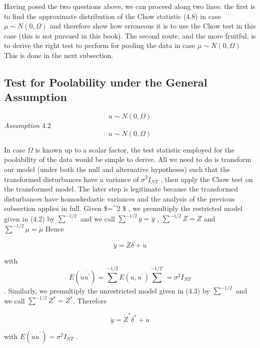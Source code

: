 \documentclass[
]{book}
\begin{document}
Having posed the two questions above, we can proceed along two lines: the first is to find the approximate distribution of the Chow statistic (4.8) in case \(\mu \sim N \left(0,\Omega \right)\) and therefore show
how erroneous it is to use the Chow test in this case (this is not pursued in this book). The second route, and the more fruitful, is to derive the right test to perform for pooling the data in case \(\mu \sim N \left(0,\Omega \right)\) This is done in the next subsection.

\hypertarget{test-for-poolability-under-the-general-assumption}{%
\subsection{Test for Poolability under the General Assumption}\label{test-for-poolability-under-the-general-assumption}}

\[ u \sim N\left(0, \Omega\right)\]
\emph{Assumption} 4.2 \[ u \sim N\left(0, \Omega\right)\]

In case \(\Omega\) is known up to a scalar factor, the test statistic employed for the poolability of
the data would be simple to derive. All we need to do is transform our model (under both
the null and alternative hypotheses) such that the transformed disturbances have a variance of \(\sigma^2 I_{NT}\) , then apply the Chow test on the transformed model. The later step is legitimate because
the transformed disturbances have homoskedastic variances and the analysis of the previous
subsection applies in full. Given \$\Omega =\sigma\^{}2 \sum \$ , we premultiply the restricted model given in (4.2)
by \(\sum^{-1/2}\) and we call \(\sum^{-1/2}y=\dot{y}\) , \(\sum^{-1/2}Z=\dot{Z}\) and \(\sum^{-1/2} \mu=\dot{\mu}\) Hence

\begin{equation}
\dot{y}=\dot{Z}\delta + \dot{u}
\end{equation}

with \[E\left(\dot{u}\dot{u^{\prime}}\right) =\sum^{-1/2} E\left(u,u^{\prime}\right) \sum^{-1/2  \prime} =\sigma^2 I_{NT} \].
Similarly, we premultiply the unrestricted model
given in (4.3) by \(\sum^{-1/2}\) and we call \(\sum^{-1/2} Z^*=Z^*\).
Therefore

\begin{equation}
\dot{y}=\dot{Z}^{*} \delta ^{*} + \dot{u}
\end{equation}

with \(E\left(\dot{u}\dot{u}^{\prime}\right)=\sigma^2 I_{NT}\) .
\end{document}
